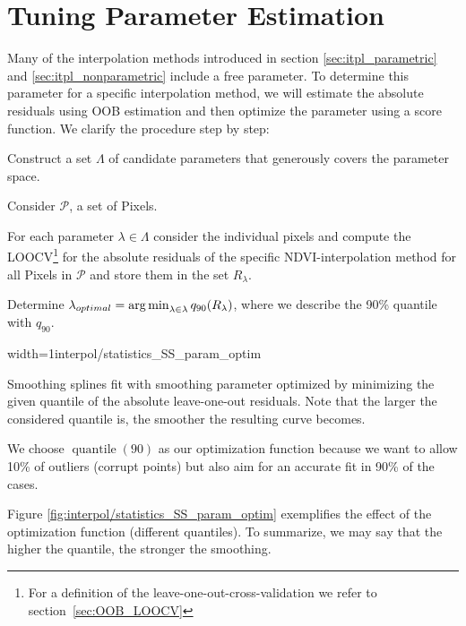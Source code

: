 \section{Tuning Parameter Estimation}{ \label{sec:itpl_param_est}
	Many of the interpolation methods introduced in section \ref{sec:itpl_parametric} and \ref{sec:itpl_nonparametric} include a free parameter. To determine this parameter for a specific interpolation method, we will estimate the absolute residuals using OOB estimation and then optimize the parameter using a score function. We clarify the procedure step by step:	
	\begin{Nenumerate}
		\item Construct a set $\Lambda$ of candidate parameters that generously covers the parameter space.
		\item Consider $\mathcal{P}$, a set of Pixels.
		\item For each parameter $\lambda \in \Lambda$ consider the individual pixels and compute the LOOCV\footnote{For a definition of the leave-one-out-cross-validation we refer to section~\ref{sec:OOB_LOOCV}} for the absolute residuals of the specific NDVI-interpolation method for all Pixels in $\mathcal{P}$ and store them in the set $R_\lambda$. 
		\item Determine $\lambda_{optimal} = \operatorname*{arg\, min}_{\lambda\in\lambda}q_{90}(R_\lambda)$, where we describe the 90\% quantile with $q_{90}$.
	\end{Nenumerate}

	\begin{my_figure}[h]{width=1\textwidth}{interpol/statistics_SS_param_optim}
		\caption{Smoothing splines fit with smoothing parameter optimized by minimizing the given quantile of the absolute leave-one-out residuals. Note that the larger the considered quantile is, the smoother the resulting curve becomes.}
		\label{fig:interpol/statistics_SS_param_optim}
	\end{my_figure}

	We choose $\operatorname{quantile}(90)$ as our optimization function because we want to allow 10\% of outliers (corrupt points) but also aim for an accurate fit in 90\% of the cases.  
	
	Figure \ref{fig:interpol/statistics_SS_param_optim} exemplifies the effect of the optimization function (different quantiles). To summarize, we may say that the higher the quantile, the stronger the smoothing. 
}


